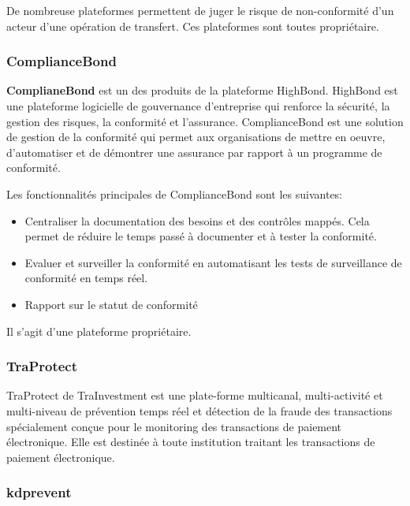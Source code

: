 De nombreuse plateformes permettent de juger le risque de non-conformité d'un acteur d'une
opération de transfert. Ces plateformes sont toutes propriétaire.

\subsubsection{ComplianceBond}

\textbf{ComplianeBond} est un des produits de la plateforme HighBond. HighBond
est une plateforme logicielle de gouvernance d'entreprise qui renforce la 
sécurité, la gestion des risques, la conformité et l'assurance. ComplianceBond
est une solution de gestion de la conformité qui permet aux organisations de
mettre en oeuvre, d'automatiser et de démontrer une assurance par rapport à un
programme de conformité.

Les fonctionnalités principales de ComplianceBond sont les suivantes:
\begin{itemize}
  \item Centraliser la documentation des besoins et des contrôles mappés. Cela
    permet de réduire le temps passé à documenter et à tester la conformité.
  \item Evaluer et surveiller la conformité en automatisant les tests de
    surveillance de conformité en temps réel.
  \item Rapport sur le statut de conformité
\end{itemize}
Il s'agit d'une plateforme propriétaire.

\subsubsection{TraProtect} 

TraProtect de TraInvestment est une plate-forme multicanal, multi-activité et
multi-niveau de prévention temps réel et détection de la fraude des 
transactions spécialement conçue pour le monitoring des transactions de 
paiement électronique. Elle est destinée à toute institution traitant les 
transactions de paiement électronique.

\subsubsection{ kdprevent}


